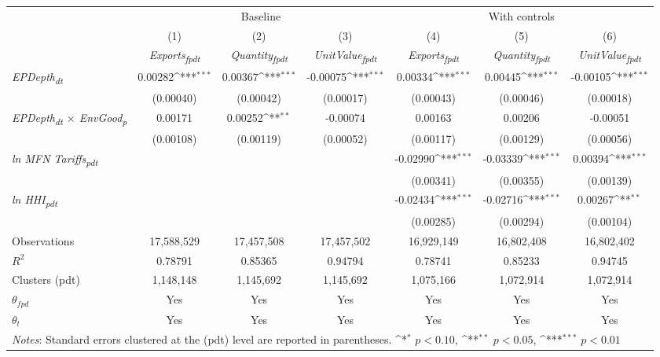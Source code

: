 {
\def\sym#1{\ifmmode^{#1}\else\(^{#1}\)\fi}
\begin{tabular}{l*{6}{c}}
\toprule
&\multicolumn{3}{c}{Baseline}&\multicolumn{3}{c}{With controls}\\\cmidrule(lr){2-4}\cmidrule(lr){5-7}
&(1)&(2)&(3)&(4)&(5)&(6)\\
&\textit{Exports\textsubscript{fpdt}}&\textit{Quantity\textsubscript{fpdt}}&\textit{UnitValue\textsubscript{fpdt}}&\textit{Exports\textsubscript{fpdt}}&\textit{Quantity\textsubscript{fpdt}}&\textit{UnitValue\textsubscript{fpdt}}\\
\midrule
\textit{EPDepth\textsubscript{dt}} & 0.00282\sym{***} & 0.00367\sym{***} & -0.00075\sym{***} & 0.00334\sym{***} & 0.00445\sym{***} & -0.00105\sym{***}\\
 & (0.00040) & (0.00042) & (0.00017) & (0.00043) & (0.00046) & (0.00018)\\
\addlinespace
\textit{EPDepth\textsubscript{dt} $\times$ EnvGood\textsubscript{p}} & 0.00171 & 0.00252\sym{**} & -0.00074 & 0.00163 & 0.00206 & -0.00051\\
 & (0.00108) & (0.00119) & (0.00052) & (0.00117) & (0.00129) & (0.00056)\\
\addlinespace
\textit{ln MFN Tariffs\textsubscript{pdt}} &  &  &  & -0.02990\sym{***} & -0.03339\sym{***} & 0.00394\sym{***}\\
 &  &  &  & (0.00341) & (0.00355) & (0.00139)\\
\addlinespace
\textit{ln HHI\textsubscript{pdt}} &  &  &  & -0.02434\sym{***} & -0.02716\sym{***} & 0.00267\sym{**}\\
 &  &  &  & (0.00285) & (0.00294) & (0.00104)\\
\midrule
Observations & 17,588,529 & 17,457,508 & 17,457,502 & 16,929,149 & 16,802,408 & 16,802,402\\
$R^{2}$ & 0.78791 & 0.85365 & 0.94794 & 0.78741 & 0.85233 & 0.94745\\
Clusters (pdt) & 1,148,148 & 1,145,692 & 1,145,692 & 1,075,166 & 1,072,914 & 1,072,914\\
$\theta_{fpd}$ & Yes & Yes & Yes & Yes & Yes & Yes\\
$\theta_{t}$ & Yes & Yes & Yes & Yes & Yes & Yes\\
\bottomrule
\multicolumn{7}{l}{\footnotesize \textit{Notes}: Standard errors clustered at the (pdt) level are reported in parentheses. \sym{*} \(p<0.10\), \sym{**} \(p<0.05\), \sym{***} \(p<0.01\)}\\
\end{tabular}
}
